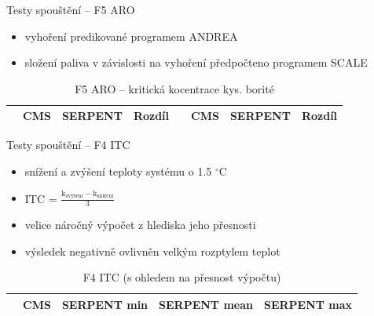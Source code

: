 \documentclass{beamer}
\begin{document}
\begin{frame}{Testy spouštění -- F5 ARO}

\begin{itemize}\footnotesize
	\item vyhoření predikované programem ANDREA
	\item složení paliva v závislosti na vyhoření předpočteno programem SCALE 
\end{itemize}

\begin{table}[h]\scriptsize
	\begin{center}
		\begin{tabular}{cccc|cccc}
			\toprule
			& CMS     & SERPENT & Rozdíl & & CMS & SERPENT & Rozdíl \\
			\midrule
			
			\bottomrule
		\end{tabular}
		\caption{\footnotesize F5 ARO -- kritická kocentrace kys. borité}
	\end{center}
\end{table}
\end{frame}

\begin{frame}{Testy spouštění -- F4 ITC}

\begin{itemize}\footnotesize
	\item snížení a zvýšení teploty systému o 1.5 $^\circ$C
\large	\item ITC =  $\frac{\textrm{k}_{\textrm{zvýšení}}-\textrm{k}_{\textrm{snížení}}}{
\textrm{3}}$

\footnotesize	\item velice náročný výpočet z hlediska jeho přesnosti
\item výsledek negativně ovlivněn velkým rozptylem teplot
\end{itemize}

\begin{table}[h]\scriptsize
	\begin{center}
		\begin{tabular}{ccccc}
			\toprule
			& CMS     & SERPENT \tiny min & SERPENT \tiny mean & SERPENT \tiny max\\
			\midrule
			
			\bottomrule
		\end{tabular}
		\caption{\footnotesize F4 ITC (s ohledem na přesnost výpočtu)}
	\end{center}
\end{table}

\end{frame}
\end{document}
